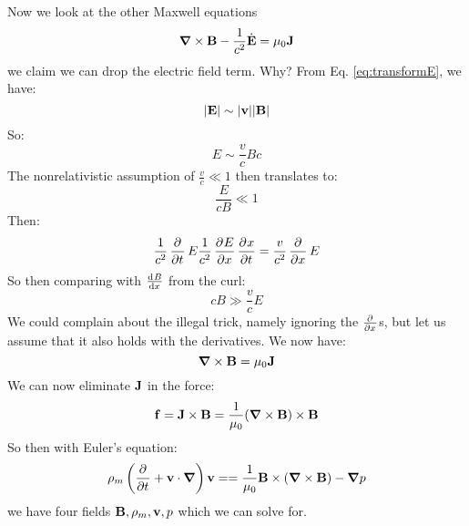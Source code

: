 Now we look at the other Maxwell equations
\begin{equation}
    \nabla \times \v{B} - \frac{1}{c^2}\dot{\v{E}} = \mu_0\v{J}
\end{equation}
we claim we can drop the electric field term. Why? From Eq. \eqref{eq:transformE}, we have:
\begin{equation}
    \lvert \mathbf{E} \rvert \sim \lvert \mathbf{v} \rvert\lvert \mathbf{B} \rvert
\end{equation}
So:
\begin{equation}
    E \sim \frac{v}{c}Bc
\end{equation}
The nonrelativistic assumption of $\frac{v}{c} \ll 1$ then translates to:
\begin{equation}
    \frac{E}{cB} \ll 1
\end{equation}
Then:
\begin{equation}
    \frac{1}{c^2}\dpd{}{t}E  \frac{1}{c^2}\dpd{E}{x}\dpd{x}{t} = \frac{v}{c^2}\dpd{}{x}E
\end{equation}
So then comparing with $\od{B}{x}$ from the curl:
\begin{equation}
    cB \gg \frac{v}{c}E
\end{equation}
We could complain about the illegal trick, namely ignoring the $\pd{}{x}$s, but let us assume that it also holds with the derivatives. We now have:
\begin{equation}
    \nabla \times \v{B} = \mu_0 \v{J}
\end{equation}
We can now eliminate $\mathbf{J}$ in the force:
\begin{equation}
    \v{f} = \v{J} \times \v{B} = \frac{1}{\mu_0}(\nabla \times \v{B}) \times \v{B}
\end{equation}
So then with Euler's equation:
\begin{equation}
    \rho_m\left(\dpd{}{t} + \v{v} \cdot \nabla\right)\v{v} = =\frac{1}{\mu_0}\v{B} \times (\nabla \times \v{B}) - \nabla p
\end{equation}
we have four fields $\mathbf{B}, \rho_m, \mathbf{v}, p$ which we can solve for.

